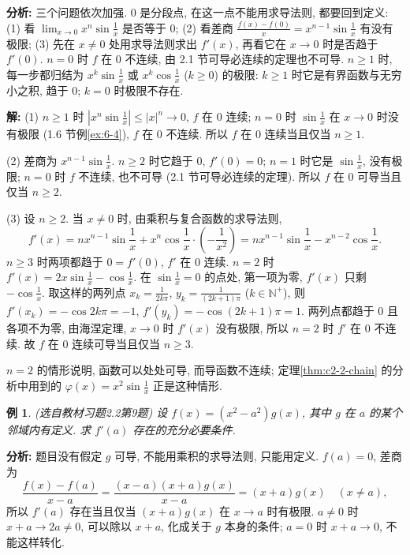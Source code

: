 \documentclass[UTF8,openany]{ctexbook}
\theoremstyle{chinesetextbook}
\newtheorem{example}{例}[section]
\newenvironment{cnsolution}{\par\indent\textbf{解:} \ignorespaces}{\par}
\begin{document}
\par\indent\textbf{分析:} 三个问题依次加强. $0$ 是分段点, 在这一点不能用求导法则, 都要回到定义: (1) 看 $\displaystyle\lim_{x\to0}x^n\sin\frac1x$ 是否等于 $0$; (2) 看差商 $\displaystyle\frac{f(x)-f(0)}x=x^{n-1}\sin\frac1x$ 有没有极限; (3) 先在 $x\ne0$ 处用求导法则求出 $f'(x)$, 再看它在 $x\to0$ 时是否趋于 $f'(0)$. $n=0$ 时 $f$ 在 $0$ 不连续, 由 2.1 节可导必连续的定理也不可导. $n\ge1$ 时, 每一步都归结为 $\displaystyle x^k\sin\frac1x$ 或 $\displaystyle x^k\cos\frac1x$ ($k\ge0$) 的极限: $k\ge1$ 时它是有界函数与无穷小之积, 趋于 $0$; $k=0$ 时极限不存在.
\begin{cnsolution}
(1) $n\ge1$ 时 $\displaystyle\left|x^n\sin\frac1x\right|\le|x|^n\to0$, $f$ 在 $0$ 连续; $n=0$ 时 $\displaystyle\sin\frac1x$ 在 $x\to0$ 时没有极限 (1.6 节例\ref{ex:6-4}), $f$ 在 $0$ 不连续. 所以 $f$ 在 $0$ 连续当且仅当 $n\ge1$.

(2) 差商为 $\displaystyle x^{n-1}\sin\frac1x$. $n\ge2$ 时它趋于 $0$, $f'(0)=0$; $n=1$ 时它是 $\displaystyle\sin\frac1x$, 没有极限; $n=0$ 时 $f$ 不连续, 也不可导 (2.1 节可导必连续的定理). 所以 $f$ 在 $0$ 可导当且仅当 $n\ge2$.

(3) 设 $n\ge2$. 当 $x\ne0$ 时, 由乘积与复合函数的求导法则,
\[
f'(x)=nx^{n-1}\sin\frac1x+x^n\cos\frac1x\cdot\left(-\frac1{x^2}\right)=nx^{n-1}\sin\frac1x-x^{n-2}\cos\frac1x.
\]
$n\ge3$ 时两项都趋于 $0=f'(0)$, $f'$ 在 $0$ 连续. $n=2$ 时 $\displaystyle f'(x)=2x\sin\frac1x-\cos\frac1x$. 在 $\displaystyle\sin\frac1x=0$ 的点处, 第一项为零, $f'(x)$ 只剩 $\displaystyle-\cos\frac1x$. 取这样的两列点 $\displaystyle x_k=\frac1{2k\pi}$, $\displaystyle y_k=\frac1{(2k+1)\pi}$ ($k\in\mathbb N^+$), 则 $f'(x_k)=-\cos2k\pi=-1$, $f'(y_k)=-\cos(2k+1)\pi=1$. 两列点都趋于 $0$ 且各项不为零, 由海涅定理, $x\to0$ 时 $f'(x)$ 没有极限, 所以 $n=2$ 时 $f'$ 在 $0$ 不连续. 故 $f$ 在 $0$ 连续可导当且仅当 $n\ge3$.
\end{cnsolution}
$n=2$ 的情形说明, 函数可以处处可导, 而导函数不连续; 定理\ref{thm:c2-2-chain} 的分析中用到的 $\displaystyle\varphi(x)=x^2\sin\frac1x$ 正是这种情形.
\begin{example}\label{ex:c2-h2-9}
\textnormal{(选自教材习题2.2第9题)} 设 $f(x)=(x^2-a^2)g(x)$, 其中 $g$ 在 $a$ 的某个邻域内有定义. 求 $f'(a)$ 存在的充分必要条件.
\end{example}
\par\indent\textbf{分析:} 题目没有假定 $g$ 可导, 不能用乘积的求导法则, 只能用定义. $f(a)=0$, 差商为
\[
\frac{f(x)-f(a)}{x-a}=\frac{(x-a)(x+a)g(x)}{x-a}=(x+a)g(x)\quad(x\ne a),
\]
所以 $f'(a)$ 存在当且仅当 $(x+a)g(x)$ 在 $x\to a$ 时有极限. $a\ne0$ 时 $x+a\to2a\ne0$, 可以除以 $x+a$, 化成关于 $g$ 本身的条件; $a=0$ 时 $x+a\to0$, 不能这样转化.
\end{document}
